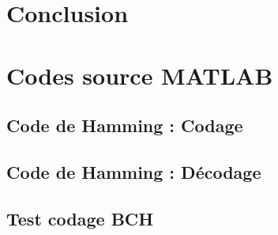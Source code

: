 \documentclass[a4paper, 12pt]{article}
\newcommand{\FSource}[1]{%

}
\begin{document}








\newpage

\section{Conclusion}

\clearpage

%
%
\appendix

\section{Codes source MATLAB}

\subsection{Code de Hamming : Codage}\label{hamcode}

\FSource{../hamcode.m}

\newpage

\subsection{Code de Hamming : Décodage}\label{hamdecode}

\FSource{../hamdecode.m}

\newpage

\subsection{Test codage BCH}\label{bchtest}

\FSource{../bchtest.m}
\end{document}
